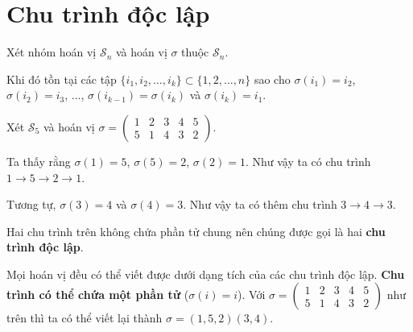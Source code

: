 \section{Chu trình độc lập}

Xét nhóm hoán vị $\mathcal{S}_n$ và hoán vị $\sigma$ thuộc $\mathcal{S}_n$.

Khi đó tồn tại các tập $\{ i_1, i_2, \ldots, i_k \} \subset \{1, 2, \ldots, n\}$
sao cho $\sigma(i_1) = i_2$, $\sigma(i_2) = i_3$, ..., $\sigma(i_{k-1})
= \sigma(i_k)$ và $\sigma(i_k) = i_1$.

\begin{example}
    Xét $\mathcal{S}_5$ và hoán vị $\sigma = \begin{pmatrix}
        1 & 2 & 3 & 4 & 5 \\ 5 & 1 & 4 & 3 & 2
    \end{pmatrix}$. 
    
    Ta thấy rằng $\sigma(1) = 5$, $\sigma(5) = 2$,
    $\sigma(2) = 1$. Như vậy ta có chu trình $1 \to 5 \to 2 \to 1$.

    Tương tự, $\sigma(3) = 4$ và $\sigma(4) = 3$. Như vậy ta
    có thêm chu trình $3 \to 4 \to 3$.

    Hai chu trình trên không chứa phần tử chung nên chúng được gọi là
    hai \textbf{chu trình độc lập}.
\end{example}

\begin{remark}
    Mọi hoán vị đều có thể viết được dưới dạng tích của các chu trình
    độc lập. \textbf{Chu trình có thể chứa một phần tử} ($\sigma(i) = i$). 
    Với $\sigma = \begin{pmatrix}
        1 & 2 & 3 & 4 & 5 \\ 5 & 1 & 4 & 3 & 2
    \end{pmatrix}$ như trên thì ta có thể viết lại thành 
    $\sigma = (1, 5, 2)(3, 4)$.
\end{remark}

